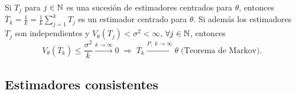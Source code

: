 \begin{observation}
Si $\displaystyle T_{j} $ para $\displaystyle j \in \mathbb{N} $ es una sucesión de estimadores centrados para $\displaystyle \theta $, entonces $\displaystyle \overline{T}_{k}=\frac{1}{k}=\frac{1}{k}\sum^{k}_{j = 1}T_{j} $ es un estimador centrado para $\displaystyle \theta $. Si además los estimadores $\displaystyle T_{j} $ son independientes y $\displaystyle V_{\theta}\left(T_{j}\right)<\sigma^{2}<\infty $, $\displaystyle \forall j \in \mathbb{N} $, entonces 
\[V_{\theta}\left(\overline{T}_{k}\right)\leq \frac{\sigma^{2}}{k} \xrightarrow{k \to \infty}0 \; \Rightarrow \; \overline{T}_{k}\xrightarrow{P, \; k \to \infty}\theta \; \text{(Teorema de Markov)}.\]
\end{observation}
\subsection{Estimadores consistentes}

